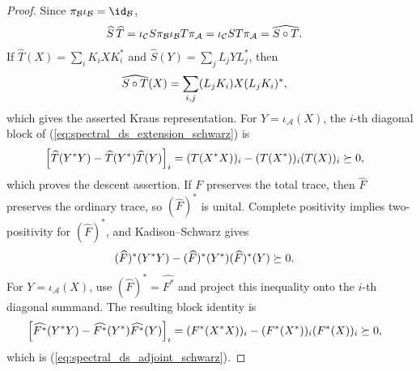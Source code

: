 \begin{proof}\leanok
    Since $\pi_{\mathcal B}\iota_{\mathcal B}=\id_{\mathcal B}$,
    \begin{align}
        \widehat S\,\widehat T
         & =\iota_{\mathcal C}S\pi_{\mathcal B}
        \iota_{\mathcal B}T\pi_{\mathcal A}
        =\iota_{\mathcal C}ST\pi_{\mathcal A}
        =\widehat{S\circ T}.
        \notag
    \end{align}
    If $\widehat T(X)=\sum_iK_iXK_i^*$ and $\widehat S(Y)=\sum_jL_jYL_j^*$, then
    \begin{align}
        \widehat{S\circ T}(X)
         & =\sum_{i,j}(L_jK_i)X(L_jK_i)^*,
        \notag
    \end{align}
    which gives the asserted Kraus representation. For $Y=\iota_{\mathcal A}(X)$, the $i$-th diagonal block of
    (\ref{eq:spectral_ds_extension_schwarz}) is
    \begin{align}
        \left[\widehat T(Y^*Y)
            -\widehat T(Y^*)\widehat T(Y)\right]_i
         & =(T(X^*X))_i-(T(X^*))_i(T(X))_i
        \succeq0,
        \notag
    \end{align}
    which proves the descent assertion. If $F$ preserves the total trace, then $\widehat F$ preserves the ordinary trace, so $(\widehat F)^*$ is
    unital. Complete positivity implies two-positivity for $(\widehat F)^*$, and Kadison--Schwarz gives
    \begin{align}
        (\widehat F)^*(Y^*Y)
        -(\widehat F)^*(Y^*)(\widehat F)^*(Y)
         & \succeq0.
        \notag
    \end{align}
    For $Y=\iota_{\mathcal A}(X)$, use $(\widehat F)^*=\widehat{F^*}$ and project this inequality onto the
    $i$-th diagonal summand. The resulting block identity is
    \begin{align}
        \left[\widehat{F^*}(Y^*Y)
            -\widehat{F^*}(Y^*)\widehat{F^*}(Y)\right]_i
         & =(F^*(X^*X))_i-(F^*(X^*))_i(F^*(X))_i
        \succeq0,
        \notag
    \end{align}
    which is (\ref{eq:spectral_ds_adjoint_schwarz}).
\end{proof}

